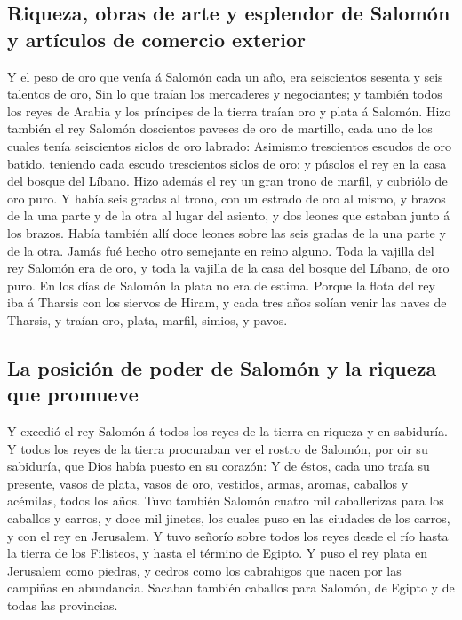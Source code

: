 \hypertarget{riqueza-obras-de-arte-y-esplendor-de-salomuxf3n-y-artuxedculos-de-comercio-exterior}{%
\subsection{Riqueza, obras de arte y esplendor de Salomón y artículos de
comercio
exterior}\label{riqueza-obras-de-arte-y-esplendor-de-salomuxf3n-y-artuxedculos-de-comercio-exterior}}

 Y el peso de oro que venía á Salomón cada un año, era
seiscientos sesenta y seis talentos de oro,  Sin lo que
traían los mercaderes y negociantes; y también todos los reyes de Arabia
y los príncipes de la tierra traían oro y plata á Salomón.
 Hizo también el rey Salomón doscientos paveses de oro de
martillo, cada uno de los cuales tenía seiscientos siclos de oro
labrado:  Asimismo trescientos escudos de oro batido,
teniendo cada escudo trescientos siclos de oro: y púsolos el rey en la
casa del bosque del Líbano.  Hizo además el rey un gran
trono de marfil, y cubriólo de oro puro.  Y había seis
gradas al trono, con un estrado de oro al mismo, y brazos de la una
parte y de la otra al lugar del asiento, y dos leones que estaban junto
á los brazos.  Había también allí doce leones sobre las
seis gradas de la una parte y de la otra. Jamás fué hecho otro semejante
en reino alguno.  Toda la vajilla del rey Salomón era de
oro, y toda la vajilla de la casa del bosque del Líbano, de oro puro. En
los días de Salomón la plata no era de estima.  Porque la
flota del rey iba á Tharsis con los siervos de Hiram, y cada tres años
solían venir las naves de Tharsis, y traían oro, plata, marfil, simios,
y pavos.

\hypertarget{la-posiciuxf3n-de-poder-de-salomuxf3n-y-la-riqueza-que-promueve}{%
\subsection{La posición de poder de Salomón y la riqueza que
promueve}\label{la-posiciuxf3n-de-poder-de-salomuxf3n-y-la-riqueza-que-promueve}}

 Y excedió el rey Salomón á todos los reyes de la tierra
en riqueza y en sabiduría.  Y todos los reyes de la
tierra procuraban ver el rostro de Salomón, por oir su sabiduría, que
Dios había puesto en su corazón:  Y de éstos, cada uno
traía su presente, vasos de plata, vasos de oro, vestidos, armas,
aromas, caballos y acémilas, todos los años.  Tuvo
también Salomón cuatro mil caballerizas para los caballos y carros, y
doce mil jinetes, los cuales puso en las ciudades de los carros, y con
el rey en Jerusalem.  Y tuvo señorío sobre todos los
reyes desde el río hasta la tierra de los Filisteos, y hasta el término
de Egipto.  Y puso el rey plata en Jerusalem como
piedras, y cedros como los cabrahigos que nacen por las campiñas en
abundancia.  Sacaban también caballos para Salomón, de
Egipto y de todas las provincias.

